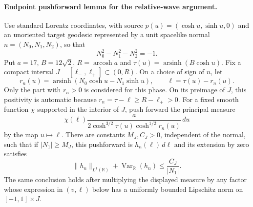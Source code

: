 \paragraph{Endpoint pushforward lemma for the relative-wave argument.}
Use standard Lorentz coordinates, with source
$p(u)=(\cosh u,\sinh u,0)$ and an unoriented target geodesic
represented by a unit spacelike normal
$n=(N_0,N_1,N_2)$, so that
\[
 N_0^2-N_1^2-N_2^2=-1.
\]
Put $a=17$, $B=12\sqrt2$, $R=\operatorname{arcosh}a$ and
$\tau(u)=\operatorname{arsinh}(B\cosh u)$.
Fix a compact interval $J=[\ell_-,\ell_+]\subset(0,R)$.
On a choice of sign of $n$, let
\[
 r_n(u)=\operatorname{arsinh}(N_0\cosh u-N_1\sinh u),
 \qquad \ell=\tau(u)-r_n(u).
\]
Only the part with $r_n>0$ is considered for this phase.  On its
preimage of $J$, this positivity is automatic because
$r_n=\tau-\ell\geq R-\ell_+>0$.
For a fixed smooth function $\chi$ supported in the interior of $J$,
push forward the principal measure
\[
 \chi(\ell)\frac{a}{2\cosh^{3/2}\tau(u)\cosh^{1/2}r_n(u)}\,du
\]
by the map $u\mapsto\ell$.  There are constants $M_J,C_J>0$,
independent of the normal, such that if $|N_1|\geq M_J$, this
pushforward is $h_n(\ell)\,d\ell$ and its extension by zero satisfies
\begin{equation}\label{A:endpoint-BV-single}
 \|h_n\|_{L^1(\mathbb R)}+
    \operatorname{Var}_{\mathbb R}(h_n)
 \leq \frac{C_J}{|N_1|}.
\end{equation}
The same conclusion holds after multiplying the displayed measure
by any factor whose expression in $(v,\ell)$ below has a uniformly
bounded Lipschitz norm on $[-1,1]\times J$.

